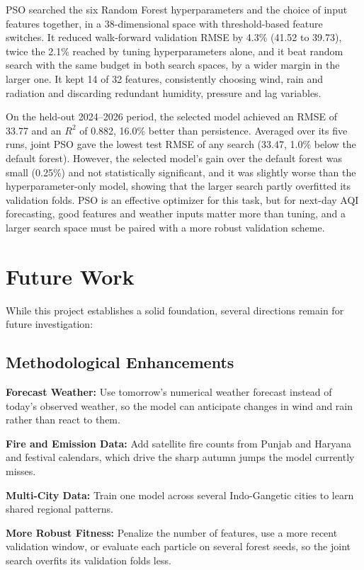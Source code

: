 PSO searched the six Random Forest hyperparameters and the choice of input features together, in a 38-dimensional space with threshold-based feature switches. It reduced walk-forward validation RMSE by 4.3\% (41.52 to 39.73), twice the 2.1\% reached by tuning hyperparameters alone, and it beat random search with the same budget in both search spaces, by a wider margin in the larger one. It kept 14 of 32 features, consistently choosing wind, rain and radiation and discarding redundant humidity, pressure and lag variables.

On the held-out 2024--2026 period, the selected model achieved an RMSE of 33.77 and an $R^2$ of 0.882, 16.0\% better than persistence. Averaged over its five runs, joint PSO gave the lowest test RMSE of any search (33.47, 1.0\% below the default forest). However, the selected model's gain over the default forest was small (0.25\%) and not statistically significant, and it was slightly worse than the hyperparameter-only model, showing that the larger search partly overfitted its validation folds. PSO is an effective optimizer for this task, but for next-day AQI forecasting, good features and weather inputs matter more than tuning, and a larger search space must be paired with a more robust validation scheme.

\section{Future Work}
While this project establishes a solid foundation, several directions remain for future investigation:

\subsection{Methodological Enhancements}

\textbf{Forecast Weather:} Use tomorrow's numerical weather forecast instead of today's observed weather, so the model can anticipate changes in wind and rain rather than react to them.

\textbf{Fire and Emission Data:} Add satellite fire counts from Punjab and Haryana and festival calendars, which drive the sharp autumn jumps the model currently misses.

\textbf{Multi-City Data:} Train one model across several Indo-Gangetic cities to learn shared regional patterns.

\textbf{More Robust Fitness:} Penalize the number of features, use a more recent validation window, or evaluate each particle on several forest seeds, so the joint search overfits its validation folds less.

